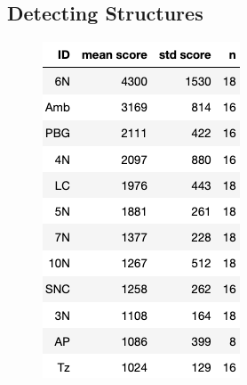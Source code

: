 \documentclass[runningheads]{llncs}
\begin{document}
\subsection{Detecting Structures}
\begin{figure}
 \includegraphics[width=\textwidth]{figures/ScoresOfStructures.png}
\end{figure}
\end{document}
